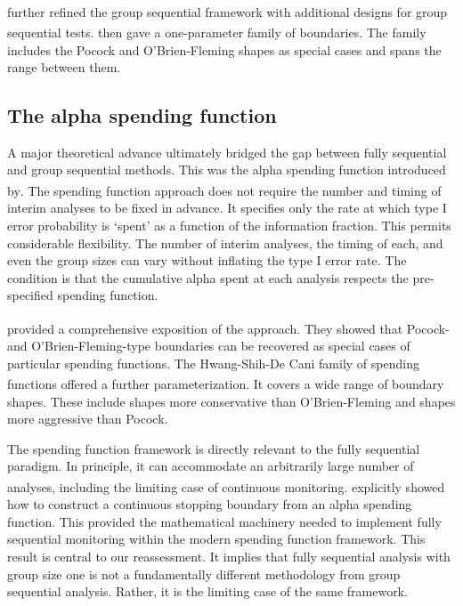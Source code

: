 \documentclass[
  11pt,
]{article}
\begin{document}
\textsuperscript{} further refined the group
sequential framework with additional designs for group
sequential tests.\textsuperscript{} then gave a
one-parameter family of boundaries. The family includes
the Pocock and O'Brien-Fleming shapes as special cases
and spans the range between them.

\subsection{The alpha spending function}\label{the-alpha-spending-function}

A major theoretical advance ultimately bridged the gap
between fully sequential and group sequential methods.
This was the alpha spending function introduced by\textsuperscript{}. The spending function approach does
not require the number and timing of interim analyses
to be fixed in advance. It specifies only the rate at
which type I error probability is `spent' as a function
of the information fraction. This permits considerable
flexibility. The number of interim analyses, the timing
of each, and even the group sizes can vary without
inflating the type I error rate. The condition is that
the cumulative alpha spent at each analysis respects
the pre-specified spending function.

\textsuperscript{} provided a comprehensive
exposition of the approach. They showed that Pocock-
and O'Brien-Fleming-type boundaries can be recovered as
special cases of particular spending functions. The
Hwang-Shih-De Cani family of spending functions\textsuperscript{} offered a further parameterization.
It covers a wide range of boundary shapes. These
include shapes more conservative than O'Brien-Fleming
and shapes more aggressive than Pocock.

The spending function framework is directly relevant to
the fully sequential paradigm. In principle, it can
accommodate an arbitrarily large number of analyses,
including the limiting case of continuous monitoring.\textsuperscript{} explicitly showed how to
construct a continuous stopping boundary from an alpha
spending function. This provided the mathematical
machinery needed to implement fully sequential
monitoring within the modern spending function
framework. This result is central to our reassessment.
It implies that fully sequential analysis with group
size one is not a fundamentally different methodology
from group sequential analysis. Rather, it is the
limiting case of the same framework.
\end{document}
